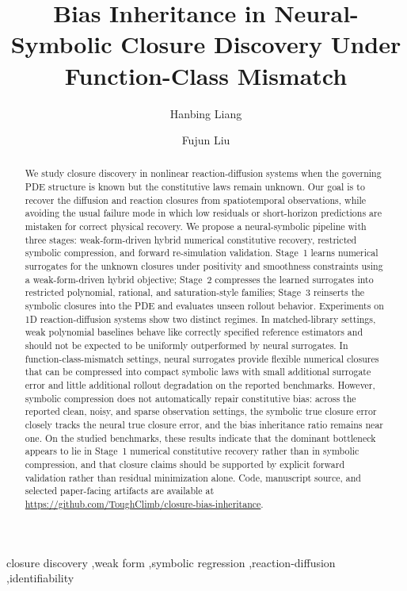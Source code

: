 \documentclass[preprint,12pt]{elsarticle}
\title{Bias Inheritance in Neural-Symbolic Closure Discovery Under Function-Class Mismatch}
\newcommand{\codeurl}{\url{https://github.com/ToughClimb/closure-bias-inheritance}}
\begin{document}
\begin{frontmatter}

\author[aff1]{Hanbing Liang}
\author[aff1]{Fujun Liu}
\address[aff1]{Nanophotonics and Biophotonics Key Laboratory of Jilin Province, School of Physics, Changchun University of Science and Technology, Changchun 130022, P.R. China}

\begin{abstract}
We study closure discovery in nonlinear reaction-diffusion systems when the governing PDE structure is known but the constitutive laws remain unknown. Our goal is to recover the diffusion and reaction closures from spatiotemporal observations, while avoiding the usual failure mode in which low residuals or short-horizon predictions are mistaken for correct physical recovery. We propose a neural-symbolic pipeline with three stages: weak-form-driven hybrid numerical constitutive recovery, restricted symbolic compression, and forward re-simulation validation. Stage~1 learns numerical surrogates for the unknown closures under positivity and smoothness constraints using a weak-form-driven hybrid objective; Stage~2 compresses the learned surrogates into restricted polynomial, rational, and saturation-style families; Stage~3 reinserts the symbolic closures into the PDE and evaluates unseen rollout behavior. Experiments on 1D reaction-diffusion systems show two distinct regimes. In matched-library settings, weak polynomial baselines behave like correctly specified reference estimators and should not be expected to be uniformly outperformed by neural surrogates. In function-class-mismatch settings, neural surrogates provide flexible numerical closures that can be compressed into compact symbolic laws with small additional surrogate error and little additional rollout degradation on the reported benchmarks. However, symbolic compression does not automatically repair constitutive bias: across the reported clean, noisy, and sparse observation settings, the symbolic true closure error closely tracks the neural true closure error, and the bias inheritance ratio remains near one. On the studied benchmarks, these results indicate that the dominant bottleneck appears to lie in Stage~1 numerical constitutive recovery rather than in symbolic compression, and that closure claims should be supported by explicit forward validation rather than residual minimization alone.
Code, manuscript source, and selected paper-facing artifacts are available at \codeurl.
\end{abstract}

\begin{keyword}
closure discovery \sep weak form \sep symbolic regression \sep reaction-diffusion \sep identifiability
\end{keyword}

\end{frontmatter}
\end{document}
